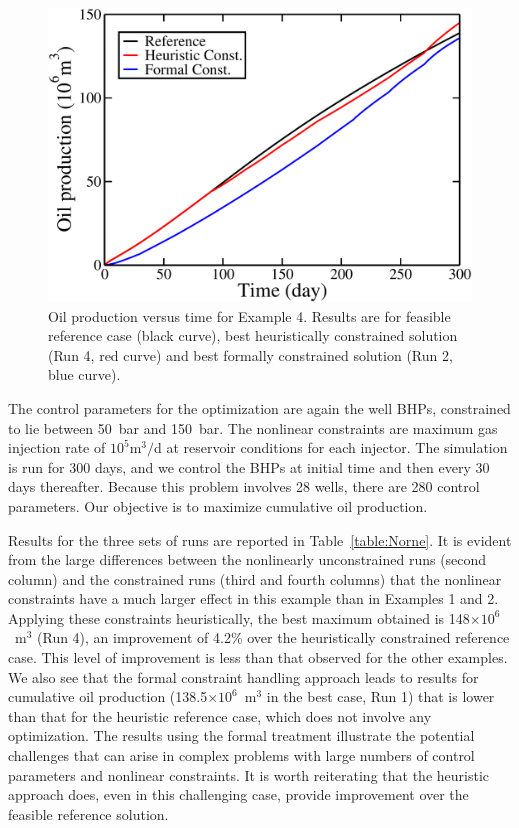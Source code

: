 \documentclass[twocolumn,numbook]{svjour3}          %
\begin{document}
\begin{figure} [ht]
\begin{center}
\includegraphics[totalheight=2.18in,angle=0]{NorneRevenue.pdf}
\end{center}
\caption{Oil production versus time for Example 4. Results are for
  feasible reference case (black curve), best heuristically constrained solution (Run 4, red curve)
  and best formally constrained solution (Run 2, blue curve).}
\label{fig:NorneRevenue}
\end{figure}



The control parameters for the optimization are again the well BHPs, constrained
to lie between 50~bar and 150~bar. The nonlinear constraints are maximum gas
injection rate of $10^5$m$^3/$d at reservoir conditions for each injector. The
simulation is run for 300 days, and we control the BHPs at initial time and then
every 30 days thereafter. Because this problem involves 28 wells, there are 280
control parameters. Our objective is to maximize cumulative oil production.

Results for the three sets of runs are reported in Table~\ref{table:Norne}. It
is evident from the large differences between the nonlinearly unconstrained runs
(second column) and the constrained runs (third and fourth columns) that the
nonlinear constraints have a much larger effect in this example than in Examples
1 and 2. Applying these constraints heuristically, the best maximum obtained is
148$\times 10^6$~m$^3$ (Run 4), an improvement of 4.2\% over the heuristically constrained
reference case. This level of improvement is less than that observed for the
other examples. We also see that the formal constraint handling approach leads
to results for cumulative oil production (138.5$\times 10^6$~m$^3$ in the best case, Run 1)
that is lower than that for the heuristic reference case, which does
not involve any optimization. The results using the formal treatment illustrate the potential challenges that can
arise in complex problems with large numbers of control parameters and nonlinear
constraints. It is worth reiterating that the heuristic approach does, even in
this challenging case, provide improvement over the feasible reference solution.
\end{document}
